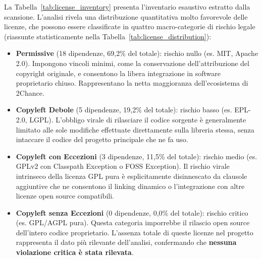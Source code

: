 La Tabella~\ref{tab:license_inventory} presenta l'inventario esaustivo estratto dalla scansione. L'analisi rivela una distribuzione quantitativa molto favorevole delle licenze, che possono essere classificate in quattro macro-categorie di rischio legale (riassunte statisticamente nella Tabella~\ref{tab:license_distribution}):

\begin{itemize}
    \item \textbf{Permissive} (18 dipendenze, 69,2\% del totale): rischio nullo (es. MIT, Apache 2.0). Impongono vincoli minimi, come la conservazione dell'attribuzione del copyright originale, e consentono la libera integrazione in software proprietario chiuso. Rappresentano la netta maggioranza dell'ecosistema di 2Chance.
    \item \textbf{Copyleft Debole} (5 dipendenze, 19,2\% del totale): rischio basso (es. EPL-2.0, LGPL). L'obbligo virale di rilasciare il codice sorgente è generalmente limitato alle sole modifiche effettuate direttamente sulla libreria stessa, senza intaccare il codice del progetto principale che ne fa uso.
    \item \textbf{Copyleft con Eccezioni} (3 dipendenze, 11,5\% del totale): rischio medio (es. GPLv2 con Classpath Exception o FOSS Exception). Il rischio virale intrinseco della licenza GPL pura è esplicitamente disinnescato da clausole aggiuntive che ne consentono il linking dinamico o l'integrazione con altre licenze open source compatibili.
    \item \textbf{Copyleft senza Eccezioni} (0 dipendenze, 0,0\% del totale): rischio critico (es. GPL/AGPL pura). Questa categoria imporrebbe il rilascio open source dell'intero codice proprietario. L'assenza totale di queste licenze nel progetto rappresenta il dato più rilevante dell'analisi, confermando che \textbf{nessuna violazione critica è stata rilevata}.
\end{itemize}

